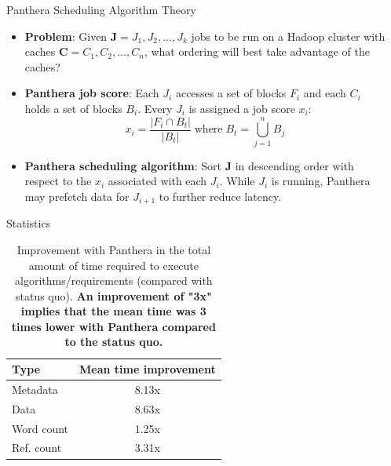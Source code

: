 \documentclass[final]{beamer} %
\begin{document}
\begin{frame}
\begin{columns}[t]
\begin{column}{0.32\textwidth}
	  
      \end{column}
            \begin{column}{0.32\textwidth}
      		\begin{block}{Panthera Scheduling Algorithm Theory}
		\begin{itemize}
			\item \textbf{Problem}: Given $\mathbf{J} = J_1, J_2, ... ,J_k$ jobs to be run
			on a Hadoop cluster with caches $\mathbf{C} = C_1, C_2, ..., C_n$, what ordering will best take advantage of the caches?
			\item \textbf{Panthera job score}: Each $J_i$ accesses a set of blocks $F_i$
			and each $C_i$ holds a set of blocks $B_i$.
			Every $J_i$ is assigned a job score $x_i$:
			\begin{equation}
				x_i = \displaystyle{\frac{\left\vert{F_i \cap B_t}\right\vert}{ \left\vert{B_t}\right\vert}} \; \textrm{where} \;
				B_t = \bigcup_{j = 1}^{n} B_j
			\end{equation}
			\item \textbf{Panthera scheduling algorithm}:
			Sort $\mathbf{J}$ in descending order with respect to the $x_i$ associated
			with each $J_i$. While $J_i$ is running, Panthera may prefetch data for $J_{i+1}$ to further reduce latency.
		\end{itemize}
		\end{block}
	
	
	
    \begin{block}{Statistics}
	\begin{table}
	\setlength{\tabcolsep}{25pt}
	\centering
	\begin{tabular}{lc}
		\toprule
		\textbf{Type} & \textbf{Mean time improvement} \\
		\midrule
		Metadata   & 8.13x \\
		Data       & 8.63x \\
		Word count & 1.25x \\
		Ref. count & 3.31x \\
	\bottomrule
	\end{tabular}
	\caption{Improvement with Panthera in the total amount of time required to execute algorithms/requirements (compared with status quo). \textbf{An improvement of "3x" implies that the mean time was 3 times lower with Panthera compared to the status quo.}}
	\end{table}
 	

\end{block}
\end{column}
\end{columns}
\end{frame}
\end{document}
